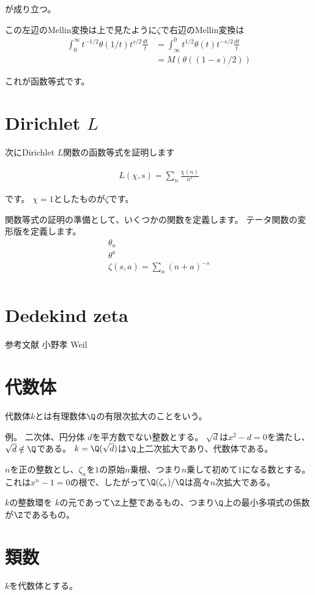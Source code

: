 \documentclass[uplatex, a4paper]{jsbook}
\begin{document}
が成り立つ。

この左辺のMellin変換は上で見たように$\zeta$で右辺のMellin変換は
\begin{align*}
\int^\infty_0t^{-1/2}\theta(1/t)t^{s/2}\frac{dt}{t}
&=\int^0_\infty t^{1/2}\theta(t)t^{-s/2}\frac{dt}{t}\\
&=M(\theta((1-s)/2))
\end{align*}

これが函数等式です。

\section{Dirichlet $L$}
次にDirichlet $L$関数の函数等式を証明します

\begin{align*}
L(\chi,s)=\sum_n\frac{\chi(n)}{n^s}
\end{align*}

です。
$\chi=1$としたものが$\zeta$です。

関数等式の証明の準備として、いくつかの関数を定義します。
テータ関数の変形版を定義します。
\begin{align*}
\theta_a\\
\theta^a\\
\zeta(s,a)=\sum_n(n+a)^{-s}\\
\end{align*}

\section{Dedekind zeta}
参考文献
小野孝
Weil

\section{代数体}
代数体$k$とは有理数体$\Q$の有限次拡大のことをいう。

例。
二次体、円分体
$d$を平方数でない整数とする。
$\sqrt{d}$は$x^2-d=0$を満たし、$\sqrt{d}\notin\Q$である。
$k=\Q(\sqrt{d})$は$\Q$上二次拡大であり、代数体である。

$n$を正の整数とし、$\zeta_n$を$1$の原始$n$乗根、つまり$n$乗して初めて$1$になる数とする。
これは$x^n-1=0$の根で、したがって$\Q(\zeta_n)/\Q$は高々$n$次拡大である。

$k$の整数環を
$k$の元であって$\Z$上整であるもの、つまり$\Q$上の最小多項式の係数が$\Z$であるもの。

\section{類数}
$k$を代数体とする。
\end{document}
